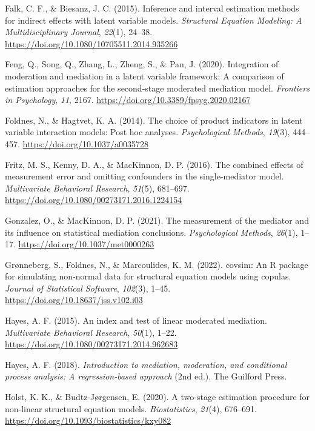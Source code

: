 \documentclass[
  man,
  longtable,
  nolmodern,
  notxfonts,
  notimes,
  colorlinks=true,linkcolor=blue,citecolor=blue,urlcolor=blue]{apa7}
\newlength{\cslhangindent}
\newenvironment{CSLReferences}[2] %
 {\begin{list}{}{%
  \setlength{\itemindent}{0pt}
  \setlength{\leftmargin}{0pt}
  \setlength{\parsep}{0pt}
  \ifodd #1
   \setlength{\leftmargin}{\cslhangindent}
   \setlength{\itemindent}{-1\cslhangindent}
  \fi
  \setlength{\itemsep}{#2\baselineskip}}}
 {\end{list}}
\begin{document}
\begin{CSLReferences}{1}{0}
Falk, C. F., \& Biesanz, J. C. (2015). Inference and interval estimation
methods for indirect effects with latent variable models.
\emph{Structural Equation Modeling: A Multidisciplinary Journal},
\emph{22}(1), 24--38. \url{https://doi.org/10.1080/10705511.2014.935266}

Feng, Q., Song, Q., Zhang, L., Zheng, S., \& Pan, J. (2020). Integration
of moderation and mediation in a latent variable framework: A comparison
of estimation approaches for the second-stage moderated mediation model.
\emph{Frontiers in Psychology}, \emph{11}, 2167.
\url{https://doi.org/10.3389/fpsyg.2020.02167}

Foldnes, N., \& Hagtvet, K. A. (2014). The choice of product indicators
in latent variable interaction models: Post hoc analyses.
\emph{Psychological Methods}, \emph{19}(3), 444--457.
\url{https://doi.org/10.1037/a0035728}

Fritz, M. S., Kenny, D. A., \& MacKinnon, D. P. (2016). The combined
effects of measurement error and omitting confounders in the
single-mediator model. \emph{Multivariate Behavioral Research},
\emph{51}(5), 681--697.
\url{https://doi.org/10.1080/00273171.2016.1224154}

Gonzalez, O., \& MacKinnon, D. P. (2021). The measurement of the
mediator and its influence on statistical mediation conclusions.
\emph{Psychological Methods}, \emph{26}(1), 1--17.
\url{https://doi.org/10.1037/met0000263}

Grønneberg, S., Foldnes, N., \& Marcoulides, K. M. (2022). {covsim}: An
{R} package for simulating non-normal data for structural equation
models using copulas. \emph{Journal of Statistical Software},
\emph{102}(3), 1--45. \url{https://doi.org/10.18637/jss.v102.i03}

Hayes, A. F. (2015). An index and test of linear moderated mediation.
\emph{Multivariate Behavioral Research}, \emph{50}(1), 1--22.
\url{https://doi.org/10.1080/00273171.2014.962683}

Hayes, A. F. (2018). \emph{Introduction to mediation, moderation, and
conditional process analysis: A regression-based approach} (2nd ed.).
The Guilford Press.

Holst, K. K., \& Budtz-Jørgensen, E. (2020). A two-stage estimation
procedure for non-linear structural equation models.
\emph{Biostatistics}, \emph{21}(4), 676--691.
\url{https://doi.org/10.1093/biostatistics/kxy082}


\end{CSLReferences}
\end{document}
